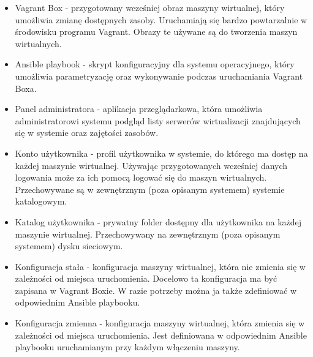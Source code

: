 \documentclass[../wstep.tex]{subfiles}
\begin{document}
\begin{itemize}
    \item Vagrant Box\parencite{vagrantbox} - przygotowany wcześniej obraz maszyny wirtualnej, który umożliwia zmianę dostępnych zasoby. Uruchamiają się bardzo powtarzalnie w środowisku programu Vagrant. Obrazy te używane są do tworzenia maszyn wirtualnych.
    \item Ansible playbook\parencite{ansible-playbook} - skrypt konfiguracyjny dla systemu operacyjnego, który umożliwia parametryzację oraz wykonywanie podczas uruchamiania Vagrant Boxa.
    \item Panel administratora - aplikacja przeglądarkowa, która umożliwia administratorowi systemu podgląd listy serwerów wirtualizacji znajdujących się w systemie oraz zajętości zasobów.
    \item Konto użytkownika - profil użytkownika w systemie, do którego ma dostęp na każdej maszynie wirtualnej. Używając przygotowanych wcześniej danych logowania może za ich pomocą logować się do maszyn wirtualnych. Przechowywane są w zewnętrznym (poza opisanym systemem) systemie katalogowym.
    \item Katalog użytkownika - prywatny folder dostępny dla użytkownika na każdej maszynie wirtualnej. Przechowywany na zewnętrznym (poza opisanym systemem) dysku sieciowym.
    \item Konfiguracja stała - konfiguracja maszyny wirtualnej, która nie zmienia się w zależności od miejsca uruchomienia. Docelowo ta konfiguracja ma być zapisana w Vagrant Boxie. W razie potrzeby można ja także zdefiniować w odpowiednim Ansible playbooku.
    \item Konfiguracja zmienna - konfiguracja maszyny wirtualnej, która zmienia się w zależności od miejsca uruchomienia. Jest definiowana w odpowiednim Ansible playbooku uruchamianym przy każdym włączeniu maszyny.
\end{itemize}
\end{document}
